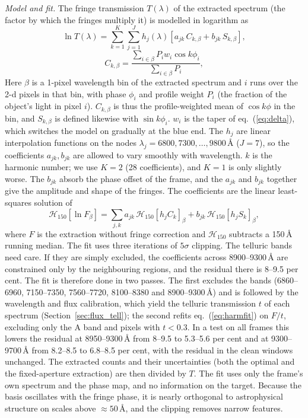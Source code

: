 \textit{Model and fit.} The fringe transmission $T(\lambda)$ of the extracted spectrum (the factor by which the
fringes multiply it) is modelled in logarithm as
\begin{equation}
\ln T(\lambda)=\sum_{k=1}^{K}\sum_{j=1}^{J}h_j(\lambda)\left[a_{jk}\,C_{k,\beta}+b_{jk}\,S_{k,\beta}\right],
\label{eq:harmonic}
\end{equation}
\begin{equation}
C_{k,\beta}=\frac{\sum_{i\in\beta}P_iw_i\cos k\phi_i}{\sum_{i\in\beta}P_i},
\label{eq:harmproj}
\end{equation}
Here $\beta$ is a 1-pixel wavelength bin of the extracted spectrum and $i$ runs over the 2-d pixels in that bin, with
phase $\phi_i$ and profile weight $P_i$ (the fraction of the object's light in pixel $i$). $C_{k,\beta}$ is thus the
profile-weighted mean of $\cos k\phi$ in the bin, and $S_{k,\beta}$ is defined likewise with $\sin k\phi_i$. $w_i$ is
the taper of eq.~(\ref{eq:delta}), which switches the model on gradually at the blue end. The $h_j$ are linear
interpolation functions on the nodes $\lambda_j=6800,7300,\dots,9800$\,\AA{} ($J=7$), so the coefficients
$a_{jk},b_{jk}$ are allowed to vary smoothly with wavelength. $k$ is the harmonic number; we use $K=2$
(28 coefficients), and $K=1$ is only slightly worse. The $b_{jk}$ absorb the phase offset of the frame, and the
$a_{jk}$ and $b_{jk}$ together give the amplitude and shape of the fringes. The coefficients are the linear
least-squares solution of
\begin{equation}
\mathcal{H}_{150}[\ln F_\beta]=\sum_{j,k}a_{jk}\,\mathcal{H}_{150}[h_jC_k]_\beta+b_{jk}\,\mathcal{H}_{150}[h_jS_k]_\beta,
\label{eq:harmfit}
\end{equation}
where $F$ is the extraction without fringe correction and $\mathcal{H}_{150}$ subtracts a 150\,\AA{} running median.
The fit uses three iterations of $5\sigma$ clipping. The telluric bands need care. If they are simply excluded,
the coefficients across 8900--9300\,\AA{} are constrained only by the neighbouring regions, and the residual there
is 8--9.5 per cent. The fit is therefore done in two passes. The first excludes
the bands (6860--6960, 7150--7350, 7560--7720, 8100--8380 and 8900--9300\,\AA) and is followed by the wavelength and
flux calibration, which yield the telluric transmission $t$ of each spectrum (Section~\ref{sec:flux_tell}); the second
refits eq.~(\ref{eq:harmfit}) on $F/t$, excluding only the A band and pixels with $t<0.3$. In a test on all frames this
lowers the residual at 8950--9300\,\AA{} from 8--9.5 to 5.3--5.6 per cent and at 9300--9700\,\AA{} from 8.2--8.5 to
6.8--8.5 per cent, with the residual in the clean windows unchanged. The extracted counts and their
uncertainties (both the optimal and the fixed-aperture extraction) are then divided by $T$. The fit uses only the
frame's own spectrum and the phase map, and no information on the target. Because the basis oscillates with the fringe phase, it is nearly orthogonal to
astrophysical structure on scales above $\approx50$\,\AA, and the clipping removes narrow features.

